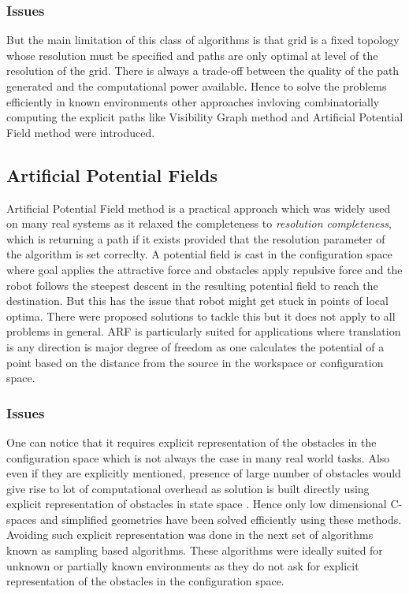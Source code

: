 \documentclass[MTech]{iitmdiss}
\begin{document}
\subsubsection{Issues}
 But the main limitation of this class of algorithms is that grid is a fixed topology whose resolution must be specified and paths are only optimal at level of  the resolution of the grid. There is always a trade-off between the quality of the path generated and the computational power available. Hence to solve the problems efficiently in known environments other approaches invloving combinatorially computing the explicit paths like Visibility Graph method \cite{visgraph00} and Artificial Potential Field method \cite{khatib86} were introduced.
 
\subsection{Artificial Potential Fields}
Artificial Potential Field method is a practical approach \cite{gecui02} which
 was widely used on many real systems as it relaxed the completeness to \emph{resolution completeness}, which is returning a path if it exists provided that the resolution parameter of the algorithm is set correclty. A potential field is cast in the configuration space where goal applies the attractive force and obstacles apply repulsive force and the robot follows the steepest descent in the resulting potential field to reach the destination. But this has the issue that robot might get stuck in points of local optima. There were proposed solutions \cite{barra91} to tackle this  but it does not apply to all problems in general. ARF is particularly suited for applications where translation is any direction is major degree of freedom as one calculates the potential of a point based on the distance from the source in the workspace or configuration space. 
\subsubsection{Issues}
 One can notice that it requires explicit representation of the obstacles in the configuration space which is not always the case in many real world tasks. Also even if they are explicitly mentioned, presence of large number of obstacles would give rise to lot of computational overhead as solution is built directly using explicit representation of obstacles  in state space . Hence only low dimensional C-spaces and simplified geometries have been solved efficiently using these methods. Avoiding such explicit representation was done in the next set of algorithms known as sampling based algorithms. These algorithms were ideally suited for unknown or partially known environments as they do not ask for explicit representation of the obstacles in the configuration space.
 
\end{document}
